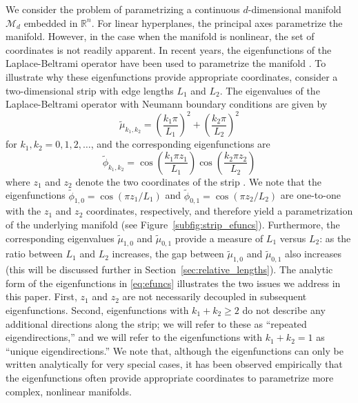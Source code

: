 We consider the problem of parametrizing a continuous $d$-dimensional manifold $\mathcal{M}_d$ embedded in $\mathbb{R}^n$.
%
For linear hyperplanes, the principal axes parametrize the manifold.
%
However, in the case when the manifold is nonlinear, the set of coordinates is not readily apparent.
%
In recent years, the eigenfunctions of the Laplace-Beltrami operator have been used to parametrize the manifold \cite{Belkin2003, coifman2005geometric, singer2008non}.
%
To illustrate why these eigenfunctions provide appropriate coordinates, consider a two-dimensional strip with edge lengths $L_1$ and $L_2$.
%
The eigenvalues of the Laplace-Beltrami operator with Neumann boundary conditions are given by
\begin{equation} \label{eq:evals}
\tilde{\mu}_{k_1, k_2} = \left( \frac{k_1 \pi}{L_1} \right)^2 + \left( \frac{k_2 \pi}{L_2} \right)^2
\end{equation}
for $k_1, k_2 = 0, 1, 2, \dots$,
and the corresponding eigenfunctions are
\begin{equation} \label{eq:efuncs}
\tilde{\phi}_{k_1, k_2} = \cos \left( \frac{k_1 \pi z_1}{L_1} \right) \cos \left( \frac{k_2 \pi z_2}{L_2} \right)
\end{equation}
where $z_1$ and $z_2$ denote the two coordinates of the strip \cite{singer2008non}.
%
We note that the eigenfunctions $\tilde{\phi}_{1, 0} = \cos \left( {\pi z_1}/{L_1} \right)$ and $\tilde{\phi}_{0, 1} = \cos \left( {\pi z_2}/{L_2} \right)$ are one-to-one with the $z_1$ and $z_2$ coordinates, respectively, and therefore yield a parametrization of the underlying manifold (see Figure~\ref{subfig:strip_efuncs}).
%
Furthermore, the corresponding eigenvalues $\tilde{\mu}_{1,0}$ and $\tilde{\mu}_{0,1}$ provide a measure of $L_1$ versus $L_2$: as the ratio between $L_1$ and $L_2$ increases, the gap between $\tilde{\mu}_{1,0}$ and $\tilde{\mu}_{0,1}$ also increases (this will be discussed further in Section~\ref{sec:relative_lengths}).
%
The analytic form of the eigenfunctions in \eqref{eq:efuncs} illustrates the two issues we address in this paper.
%
First, $z_1$ and $z_2$ are not necessarily decoupled in subsequent eigenfunctions.
%
Second, eigenfunctions with $k_1+k_2 \ge 2$ do not describe any additional directions along the strip; we will refer to these as ``repeated eigendirections,'' and we will refer to the eigenfunctions with $k_1+k_2 =1$ as ``unique eigendirections.''
%
We note that, although the eigenfunctions can only be written analytically for very special cases, it has been observed empirically that the eigenfunctions often provide appropriate coordinates to parametrize more complex, nonlinear manifolds.


